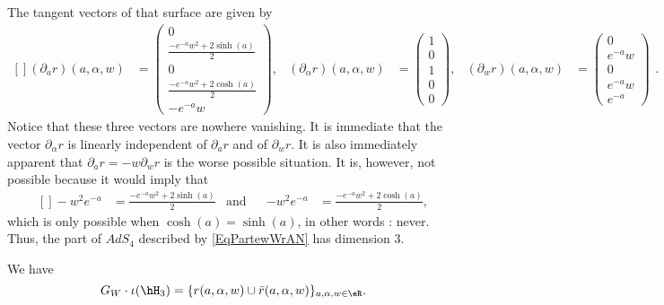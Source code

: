 The tangent vectors of that surface are given by
\begin{equation}
	\begin{aligned}[]
		(\partial_ar)(a,\alpha,w)&=
\begin{pmatrix}
	0	\\ 
	\frac{ - e^{-a}w^2+2\sinh(a) }{2}	\\ 
	0	\\ 
	\frac{ - e^{-a}w^2+2\cosh(a) }{2}	\\ 
	- e^{-a}w	
\end{pmatrix}
,&
		(\partial_{\alpha}r)(a,\alpha,w)&=
\begin{pmatrix}
	1	\\ 
	0\\ 
	1	\\ 
	0\\ 
	0	
\end{pmatrix}
,&
		(\partial_wr)(a,\alpha,w)&=
\begin{pmatrix}
	0	\\ 
	 e^{-a}w\\ 
	0	\\ 
	 e^{-a}w\\ 
	e^{-a}
\end{pmatrix}
	\end{aligned}.
\end{equation}
Notice that these three vectors are nowhere vanishing. It is immediate that the vector $\partial_{\alpha}r$ is linearly independent of $\partial_{a}r$ and of $\partial_wr$. It is also immediately apparent that $\partial_ar=-w\partial_wr$ is the worse possible situation. It is, however, not possible because it would imply that 
\begin{equation}
	\begin{aligned}[]
		-w^2 e^{-a}&=\frac{ - e^{-a}w^2+2\sinh(a) }{2}&\text{and}&&-w^2 e^{-a}&=\frac{ - e^{-a}w^2+2\cosh(a) }{2},
	\end{aligned}
\end{equation}
which is only possible when $\cosh(a)=\sinh(a)$, in other words : never. Thus, the part of $AdS_4$ described by \eqref{EqPartewWrAN} has dimension $3$.


\begin{proposition}
We have
\begin{equation}
	 G_W\cdot\iota(\hH_3)=
	\{ r(a,\alpha,w)\cup\bar r(a,\alpha,w) \}_{a,\alpha,w\in\eR}.	
\end{equation}
\end{proposition}

